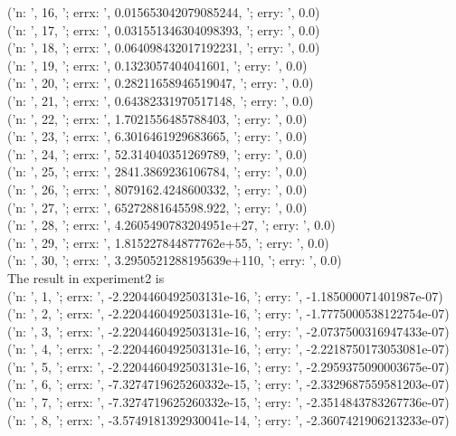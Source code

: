 \documentclass[12pt]{article}
\begin{document}
\begin{enumerate}
\begin{enumerate}
('n: ', 16, '; errx: ', 0.015653042079085244, '; erry: ', 0.0)\\
('n: ', 17, '; errx: ', 0.031551346304098393, '; erry: ', 0.0)\\
('n: ', 18, '; errx: ', 0.064098432017192231, '; erry: ', 0.0)\\
('n: ', 19, '; errx: ', 0.1323057404041601, '; erry: ', 0.0)\\
('n: ', 20, '; errx: ', 0.28211658946519047, '; erry: ', 0.0)\\
('n: ', 21, '; errx: ', 0.64382331970517148, '; erry: ', 0.0)\\
('n: ', 22, '; errx: ', 1.7021556485788403, '; erry: ', 0.0)\\
('n: ', 23, '; errx: ', 6.3016461929683665, '; erry: ', 0.0)\\
('n: ', 24, '; errx: ', 52.314040351269789, '; erry: ', 0.0)\\
('n: ', 25, '; errx: ', 2841.3869236106784, '; erry: ', 0.0)\\
('n: ', 26, '; errx: ', 8079162.4248600332, '; erry: ', 0.0)\\
('n: ', 27, '; errx: ', 65272881645598.922, '; erry: ', 0.0)\\
('n: ', 28, '; errx: ', 4.2605490783204951e+27, '; erry: ', 0.0)\\
('n: ', 29, '; errx: ', 1.815227844877762e+55, '; erry: ', 0.0)\\
('n: ', 30, '; errx: ', 3.2950521288195639e+110, '; erry: ', 0.0)\\
The result in experiment2 is\\
('n: ', 1, '; errx: ', -2.2204460492503131e-16, '; erry: ', -1.185000071401987e-07)\\
('n: ', 2, '; errx: ', -2.2204460492503131e-16, '; erry: ', -1.7775000538122754e-07)\\
('n: ', 3, '; errx: ', -2.2204460492503131e-16, '; erry: ', -2.0737500316947433e-07)\\
('n: ', 4, '; errx: ', -2.2204460492503131e-16, '; erry: ', -2.2218750173053081e-07)\\
('n: ', 5, '; errx: ', -2.2204460492503131e-16, '; erry: ', -2.2959375090003675e-07)\\
('n: ', 6, '; errx: ', -7.3274719625260332e-15, '; erry: ', -2.3329687559581203e-07)\\
('n: ', 7, '; errx: ', -7.3274719625260332e-15, '; erry: ', -2.3514843783267736e-07)\\
('n: ', 8, '; errx: ', -3.5749181392930041e-14, '; erry: ', -2.3607421906213233e-07)\\

\end{enumerate}
\end{enumerate}
\end{document}
